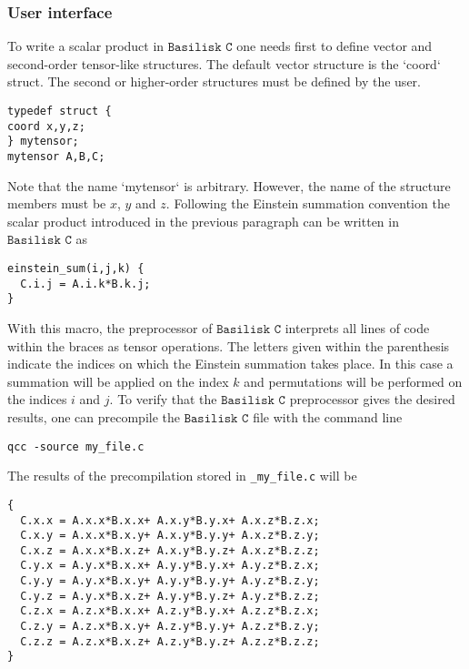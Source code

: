 \subsubsection{ User interface}

To write a scalar product in $\texttt{Basilisk C}$ one needs first to define vector and second-order tensor-like structures. The default vector structure is the `coord` struct. The second or higher-order structures must be defined by the user. 

\begin{lstlisting}
typedef struct {
coord x,y,z;
} mytensor;
mytensor A,B,C; 
\end{lstlisting}

Note that the name `mytensor` is arbitrary. However, the name of the structure members must be $x$, $y$ and $z$. Following the Einstein summation convention the scalar product introduced in the previous paragraph can be written in $\texttt{Basilisk C}$ as

\begin{lstlisting}
einstein_sum(i,j,k) {
  C.i.j = A.i.k*B.k.j; 
}
\end{lstlisting}

With this macro, the preprocessor of $\texttt{Basilisk C}$ interprets all lines of code within the braces as tensor operations. The letters given within the parenthesis indicate the indices on which the Einstein summation takes place. In this case a summation will be applied on the index $k$ and permutations will be performed on the indices $i$ and $j$. 
To verify that the $\texttt{Basilisk C}$ preprocessor gives the desired results, one can precompile the $\texttt{Basilisk C}$ file with the command line

\begin{lstlisting}
qcc -source my_file.c
\end{lstlisting}

The results of the precompilation stored in \texttt{\_my\_file.c} will be

\begin{lstlisting}
{
  C.x.x = A.x.x*B.x.x+ A.x.y*B.y.x+ A.x.z*B.z.x;
  C.x.y = A.x.x*B.x.y+ A.x.y*B.y.y+ A.x.z*B.z.y;
  C.x.z = A.x.x*B.x.z+ A.x.y*B.y.z+ A.x.z*B.z.z;
  C.y.x = A.y.x*B.x.x+ A.y.y*B.y.x+ A.y.z*B.z.x;
  C.y.y = A.y.x*B.x.y+ A.y.y*B.y.y+ A.y.z*B.z.y;
  C.y.z = A.y.x*B.x.z+ A.y.y*B.y.z+ A.y.z*B.z.z;
  C.z.x = A.z.x*B.x.x+ A.z.y*B.y.x+ A.z.z*B.z.x;
  C.z.y = A.z.x*B.x.y+ A.z.y*B.y.y+ A.z.z*B.z.y;
  C.z.z = A.z.x*B.x.z+ A.z.y*B.y.z+ A.z.z*B.z.z;
}
\end{lstlisting}

